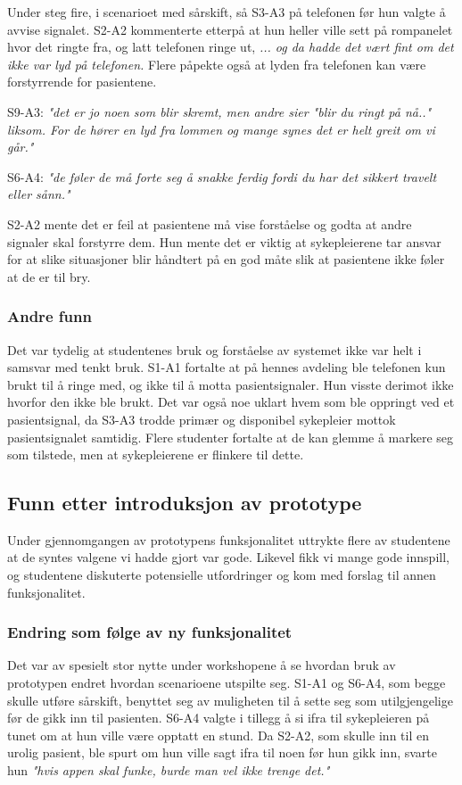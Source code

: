 \noindent
Under steg fire, i scenarioet med sårskift, så S3-A3 på telefonen før hun valgte å avvise signalet. S2-A2 kommenterte etterpå at hun heller ville sett på rompanelet hvor det ringte fra, og latt telefonen ringe ut, \emph{... og da hadde det vært fint om det ikke var lyd på telefonen.} 
Flere påpekte også at lyden fra telefonen kan være forstyrrende for pasientene. 

\noindent
S9-A3: \emph{"det er jo noen som blir skremt, men andre sier "blir du ringt på nå.." liksom. For de hører en lyd fra lommen og mange synes det er helt greit om vi går."}

\noindent
S6-A4: \emph{"de føler de må forte seg å snakke ferdig fordi du har det sikkert travelt eller sånn."}

\noindent
S2-A2 mente det er feil at pasientene må vise forståelse og godta at andre signaler skal forstyrre dem. Hun mente det er viktig at sykepleierene tar ansvar for at slike situasjoner blir håndtert på en god måte slik at pasientene ikke føler at de er til bry.

\subsubsection{Andre funn}
Det var tydelig at studentenes bruk og forståelse av systemet ikke var helt i samsvar med tenkt bruk. S1-A1 fortalte at på hennes avdeling ble telefonen kun brukt til å ringe med, og   ikke til å motta pasientsignaler. Hun visste derimot ikke hvorfor den ikke ble brukt.
Det var også noe uklart hvem som ble oppringt ved et pasientsignal, da S3-A3 trodde primær og disponibel sykepleier mottok pasientsignalet samtidig. 
Flere studenter fortalte at de kan glemme å markere seg som tilstede, men at sykepleierene er flinkere til dette. 

\subsection{Funn etter introduksjon av prototype}
Under gjennomgangen av prototypens funksjonalitet uttrykte flere av studentene at de syntes valgene vi hadde gjort var gode. Likevel fikk vi mange gode innspill, og studentene diskuterte potensielle utfordringer og kom med forslag til annen funksjonalitet. 

\subsubsection{Endring som følge av ny funksjonalitet}
Det var av spesielt stor nytte under workshopene å se hvordan bruk av prototypen endret hvordan scenarioene utspilte seg. S1-A1 og S6-A4, som begge skulle utføre sårskift, benyttet seg av muligheten til å sette seg som utilgjengelige før de gikk inn til pasienten. S6-A4 valgte i tillegg å si ifra til sykepleieren på tunet om at hun ville være opptatt en stund. Da S2-A2, som skulle inn til en urolig pasient, ble spurt om hun ville sagt ifra til noen før hun gikk inn, svarte hun \emph{"hvis appen skal funke, burde man vel ikke trenge det."}

